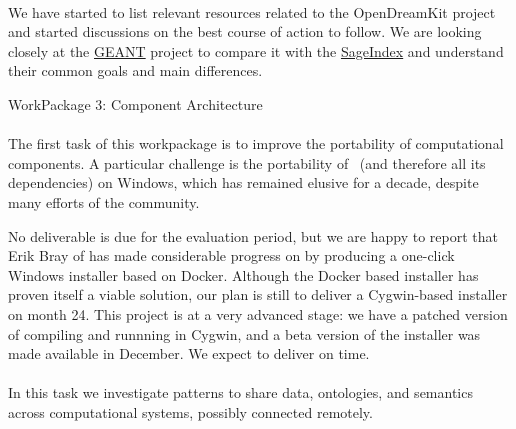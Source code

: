 \documentclass{deliverablereport}
\makeatletter
\renewcommand\subsubsection{\@startsection{subsubsection}{2}%
  \z@{.5\linespacing\@plus.7\linespacing}{.1\linespacing}%
  {\normalfont\bfseries}}
\makeatother
\begin{document}
\paragraph{}

We have started to list relevant resources related to the OpenDreamKit project and started discussions
on the best course of action to follow. We are looking closely at the \href{https://oer.geant.org/}{GEANT} 
project to compare it with the \href{http://sageindex.lipn.univ-paris13.fr/}{SageIndex} and understand their
common goals and main differences.

\clearpage
  \subsubsection{WorkPackage 3:  Component Architecture}

  \paragraph{}
  \label{component-architecture@portability}
  The first task of this workpackage is to improve the portability of
  computational components. A particular challenge is the portability
  of \Sage\ (and therefore all its dependencies) on Windows, which has
  remained elusive for a decade, despite many efforts of the
  community.

  No deliverable is due for the evaluation period, but we are happy to
  report that Erik Bray of  has made considerable progress on
   by producing a
  one-click Windows installer based on Docker. Although the Docker
  based installer has proven itself a viable solution, our plan is
  still to deliver a Cygwin-based installer on month 24. This project
  is at a very advanced stage: we have a patched version of \Sage
  compiling and runnning in Cygwin, and a beta version of the
  installer was made available in December. We expect to deliver
   on time.

  \paragraph{}
  \label{component-architecture@interface-systems}
  In this task we investigate patterns to share data, ontologies,
  and semantics across computational systems, possibly connected
  remotely.
\end{document}
